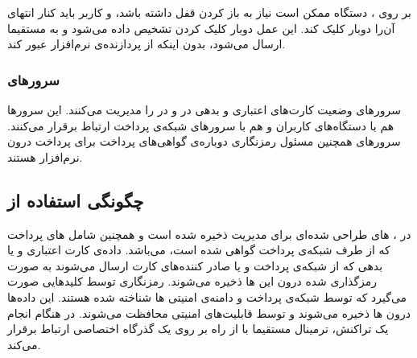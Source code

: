 \documentclass[oneside]{report}
\begin{document}
   بر روی 
              {\normalsize {}}
              ، دستگاه ممکن است نیاز به باز کردن قفل داشته باشد، و کاربر باید کنار انتهای آن‌را دوبار کلیک کند. این عمل دوبار کلیک کردن تشخیص داده می‌شود و به 
                         {\normalsize {}}
                      مستقیما   ارسال می‌شود،   بدون اینکه از پردازنده‌ی نرم‌افزار عبور کند.
                      
      \subsubsection{سرورهای{\small {}}} 
      سرورهای 
   {\normalsize {}}
   وضعیت کارت‌های اعتباری و بدهی در 
   {\normalsize {}}
   و 
   {\normalsize {}}
   در 
   {\normalsize {}}
   را مدیریت می‌کنند. این سرورها هم با دستگاه‌‌های کاربران و هم با سرورهای شبکه‌ی پرداخت ارتباط برقرار می‌کنند.
   سرور‌های 
   {\normalsize {}}
   همچنین مسئول رمزنگاری دوباره‌ی گواهی‌های پرداخت 
         					برای پرداخت درون نرم‌افزار           
   هستند. 
               
    \subsection{چگونگی استفاده {\small {}} از {\small {}}  ‌ }           
    در 
                  {\normalsize {}}
                  ،               {\normalsize {}} های طراحی شده‌ای  
                  برای مدیریت 
                                {\normalsize {}}
                                ذخیره شده است و همچنین شامل 
                                              {\normalsize {}} های پرداخت که از طرف شبکه‌ی پرداخت گواهی شده است،  می‌باشد. 
                                              داده‌ی کارت اعتباری و یا بدهی که از شبکه‌ی پرداخت و یا صادر کننده‌های کارت ارسال می‌شوند به صورت رمزگذاری شده درون این 
                                                            {\normalsize {}} ها 
     ذخیره می‌شوند. رمزنگاری توسط کلیدهایی صورت می‌گیرد که توسط شبکه‌ی پرداخت و دامنه‌ی امنیتی 
                   {\normalsize {}}ها 
                   شناخته شده هستند. این داده‌ها درون 
                                 {\normalsize {}} ها 
                                 ذخیره می‌شوند و توسط قابلیت‌های امنیتی
                                               {\normalsize {}}
                                               محافظت می‌شوند.
   در هنگام انجام یک تراکنش،  ترمینال مستقیما با 
                 {\normalsize {}}
                 از راه
                               {\normalsize {}}
                               بر روی یک گذرگاه اختصاصی ارتباط برقرار می‌کند.
                               
\end{document}
